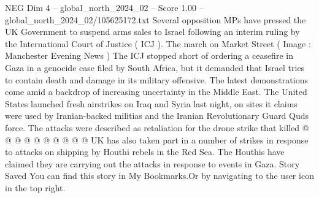 \begin{textsample}{NEG Dim 4 – global\_north\_2024\_02 – Score 1.00 – global\_north\_2024\_02/105625172.txt}
Several opposition MPs have pressed the UK Government to suspend arms sales to Israel following an interim ruling by the International Court of Justice ( ICJ ).
The march on Market Street ( Image : Manchester Evening News ) The ICJ stopped short of ordering a ceasefire in Gaza in a genocide case filed by South Africa, but it demanded that Israel tries to contain death and damage in its military offensive.
The latest demonstrations come amid a backdrop of increasing uncertainty in the Middle East.
The United States launched fresh airstrikes on Iraq and Syria last night, on sites it claims were used by Iranian-backed militias and the Iranian Revolutionary Guard Quds force.
The attacks were described as retaliation for the drone strike that killed @ @ @ @ @ @ @ @ @ @ UK has also taken part in a number of strikes in response to attacks on shipping by Houthi rebels in the Red Sea.
The Houthis have claimed they are carrying out the attacks in response to events in Gaza.
Story Saved You can find this story in My Bookmarks.Or by navigating to the user icon in the top right.

\end{textsample}

